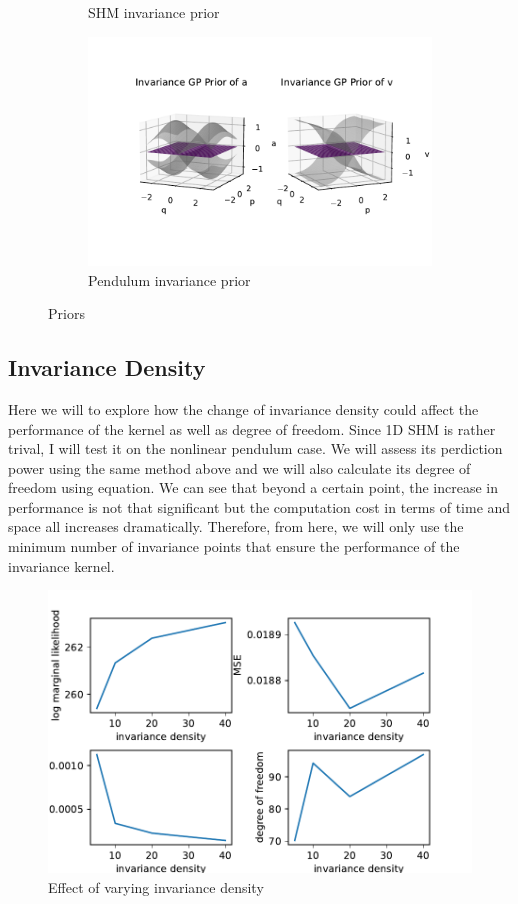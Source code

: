 \documentclass{statsmsc}
\begin{document}
\begin{figure}[H]
\begin{subfigure}[b]{0.5\linewidth}
         \caption{SHM invariance prior}
         \label{fig:prior_shm_invariance}
     \end{subfigure}
     \hfill
     \begin{subfigure}[b]{0.5\linewidth}
         \centering
         \includegraphics[width=\linewidth]{../codes/figures/prior_pendulum_invariance.pdf}
         \caption{Pendulum invariance prior}
         \label{fig:prior_pendulum_invariance}
     \end{subfigure}
        \caption{Priors}
        \label{fig:priors}
\end{figure}

\subsection{Invariance Density}
Here we will to explore how the change of invariance density could affect the performance of the kernel as well as degree of freedom.
Since 1D SHM is rather trival, I will test it on the nonlinear pendulum case. 
We will assess its perdiction power using the same method above and we will also calculate its degree of freedom using equation.
We can see that beyond a certain point, the increase in performance is not that significant but the computation cost in terms of time and space all increases dramatically.
Therefore, from here, we will only use the minimum number of invariance points that ensure the performance of the invariance kernel. 

\begin{figure}[H] 
  \includegraphics[width=0.6\linewidth]{../codes/figures/vary_invariance.pdf}
  \centering
  \caption{Effect of varying invariance density}
  \label{fig:vary_invariance_density}
\end{figure}
\end{document}
